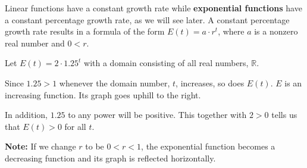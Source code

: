 \documentclass{ximera}
\begin{document}
Linear functions have a constant growth rate while \textbf{exponential functions} have a constant percentage growth rate, as we will see later.  A constant percentage growth rate results in a formula of the form $E(t) = a \cdot r^t$, where $a$ is a nonzero real number and $0 < r$.



\begin{example}

Let $E(t) = 2 \cdot 1.25^t$ with a domain consisting of all real numbers, $\mathbb{R}$.


Since $1.25 > 1$ whenever the domain number, $t$, increases, so does $E(t)$.  $E$ is an increasing function.  Its graph goes uphill to the right.









\begin{image}
\end{image}





In addition, $1.25$ to any power will be positive.  This together with $2>0$ tells us that $E(t) > 0$ for all $t$.


\end{example}


\textbf{Note:} If we change $r$ to be $0 < r < 1$, the exponential function becomes a decreasing function and its graph is reflected horizontally.
\end{document}
